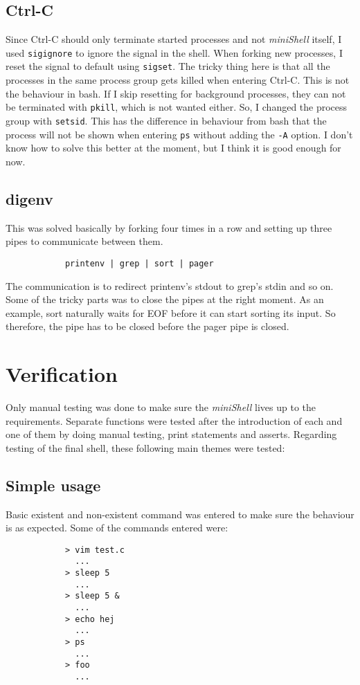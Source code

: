 \documentclass{article}
\begin{document}
   \subsection{Ctrl-C}
        Since Ctrl-C should only terminate started processes and not
        \emph{miniShell} itself, I used \texttt{sigignore} to ignore the signal
        in the shell. When forking new processes, I reset the signal to
        default using \texttt{sigset}. The tricky thing here is that all the
        processes in the same process group gets killed when entering Ctrl-C.
        This is not the behaviour in bash. If I skip resetting for background
        processes, they can not be terminated with \texttt{pkill}, which is not
        wanted either. So, I changed the process group with \texttt{setsid}.
        This has the difference in behaviour from bash that the process will
        not be shown when entering \texttt{ps} without adding the \texttt{-A}
        option. I don't know how to solve this better at the moment, but I
        think it is good enough for now.

   \subsection{digenv}
        This was solved basically by forking four times in a row and setting up three
        pipes to communicate between them.
        \begin{verbatim}
            printenv | grep | sort | pager
        \end{verbatim}
        The communication is to redirect printenv's stdout to grep's stdin and so on.
        Some of the tricky parts was to close the pipes at the right moment. As an
        example, sort naturally waits for EOF before it can start sorting its input.
        So therefore, the pipe has to be closed before the pager pipe is closed.
        
\section{Verification}
    Only manual testing was done to make sure the \emph{miniShell} lives up to
    the requirements. Separate functions were tested after the introduction of each
    and one of them by doing manual testing, print statements and asserts.
    Regarding testing of the final shell, these following main themes were tested:
    \subsection{Simple usage}
        Basic existent and non-existent command was entered to make sure the
        behaviour is as expected. Some of the commands entered were:
        \begin{verbatim}
            > vim test.c
              ...
            > sleep 5
              ...
            > sleep 5 &
              ...
            > echo hej
              ...
            > ps
              ...
            > foo
              ...
        \end{verbatim}
\end{document}
